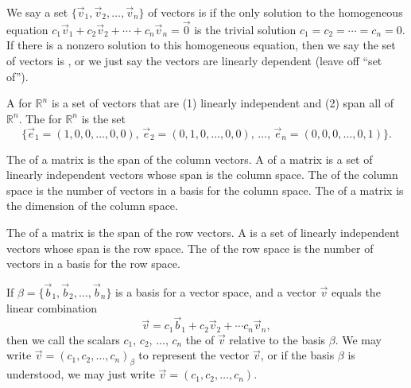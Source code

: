 \begin{definition} 
%
We say a set $\{\vec v_1,\vec v_2,\ldots,\vec v_n\}$ of vectors is  if the only solution to the homogeneous equation $c_1 \vec v_1+c_2\vec v_2+\cdots+c_n\vec v_n=\vec 0$ is the trivial solution $c_1=c_2=\cdots=c_n=0$. If there is a nonzero solution to this homogeneous equation, then we say the set of vectors is , or we just say the vectors are linearly dependent (leave off ``set of'').
\end{definition}

\begin{definition}[Basis]
A  for $\mathbb{R}^n$ is a set of vectors that are (1) linearly independent and (2) span all of $\mathbb{R}^n$.
The  for $\mathbb{R}^n$ is the set 
$$\{\vec e_1 = (1,0,0,\ldots,0,0),\, 
\vec e_2 = (0,1,0,\ldots,0,0),\, 
\ldots,\, 
\vec e_n = (0,0,0,\ldots,0,1)\}.$$
\end{definition}

\begin{definition} 
%
The  of a matrix is the span of the column vectors. 
A  of a matrix is a set of linearly independent vectors whose span is the column space. 
The  of the column space is the number of vectors in a basis for the column space. 
The  of a matrix is the dimension of the column space.
\end{definition}


\begin{definition} 
%
The  of a matrix is the span of the row vectors. 
A  is a set of linearly independent vectors whose span is the row space. 
The  of the row space is the number of vectors in a basis for the row space.
\end{definition}

\begin{definition}[Coordinates]
%
If $\beta=\{\vec b_1,\vec b_2,\ldots,\vec b_n\}$ is a basis for a vector space, and a vector $\vec v$ equals the linear combination 
$$ \vec v = c_1\vec b_1+c_2\vec v_2 + \cdots c_n\vec v_n, $$ then we call the scalars $c_1,\,c_2,\,\ldots,\, c_n$ the   of $\vec v$ relative to the basis $\beta$. We may write $\vec v = (c_1,c_2,\ldots, c_n)_\beta$ to represent the vector $\vec v$, or if the basis $\beta$ is understood, we may just write $\vec v = (c_1,c_2,\ldots, c_n)$.
\end{definition}

